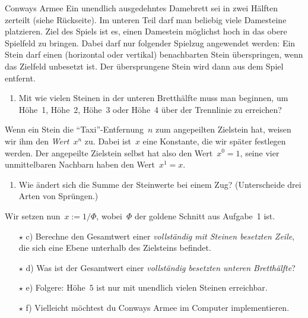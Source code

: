 \documentclass{../zirkelblatt}
\begin{document}
\begin{aufgabe}{Conways Armee}
Ein unendlich ausgedehntes Damebrett sei in zwei Hälften zerteilt (siehe
Rückseite). Im unteren Teil darf man beliebig viele Damesteine platzieren. Ziel
des Spiels ist es, einen Damestein möglichst hoch in das obere Spielfeld zu
bringen. Dabei darf nur folgender Spielzug angewendet werden: Ein Stein
darf einen (horizontal oder vertikal) benachbarten Stein überspringen, wenn das
Zielfeld unbesetzt ist. Der übersprungene Stein wird dann aus dem Spiel
entfernt.
\begin{enumerate}
\item Mit wie vielen Steinen in der unteren Bretthälfte muss man beginnen, um
Höhe~1, Höhe~2, Höhe~3 oder Höhe~4 über der Trennlinie zu erreichen?
\end{enumerate}
Wenn ein Stein die
"`Taxi"'-Entfernung~$n$ zum angepeilten Zielstein hat, weisen wir ihm den \emph{Wert}~$x^n$ zu.
Dabei ist~$x$ eine Konstante, die wir später festlegen werden.
Der angepeilte Zielstein selbst hat also den Wert~$x^0 = 1$, seine vier
unmittelbaren Nachbarn haben den Wert~$x^1 = x$.
\begin{enumerate}
\addtocounter{enumi}{1}
\item Wie ändert sich die Summe der Steinwerte bei einem Zug? (Unterscheide drei Arten von Sprüngen.)
\end{enumerate}
Wir setzen nun~$x := 1/\Phi$, wobei~$\Phi$ der goldene Schnitt aus Aufgabe~1
ist.
\begin{enumerate}
\item[$\star$ c)] Berechne den Gesamtwert einer \emph{vollständig mit
Steinen besetzten Zeile}, die sich eine Ebene unterhalb des Zielsteins befindet.
\item[$\star$ d)] Was ist der Gesamtwert einer \emph{vollständig besetzten unteren Bretthälfte}?
\item[$\star$ e)] Folgere: Höhe~$5$ ist nur mit unendlich vielen Steinen
erreichbar.
\item[$\star$ f)] Vielleicht möchtest du Conways Armee im Computer implementieren.
\end{enumerate}
\end{aufgabe}

\newpage

\newcommand*{\xMin}{0}%
\newcommand*{\xMax}{6}%
\newcommand*{\yMin}{0}%
\newcommand*{\yMax}{6}%
\hspace*{-1.8cm}%
\end{document}
